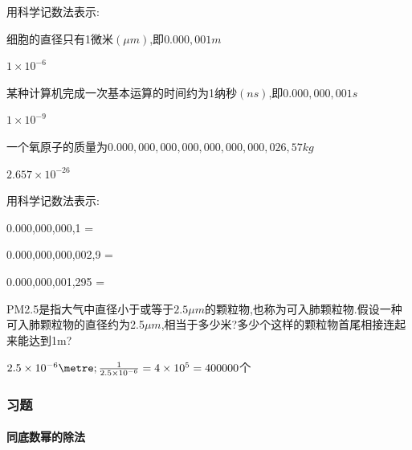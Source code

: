 \documentclass[cn,blue,12pt]{elegantbook}
\renewcommand \tkt[1]{{\CJKunderline[hidden=true, skip=true, thickness=1pt]{#1}}}
\begin{document}
\begin{liti}[resume]
\item 用科学记数法表示:
    \begin{liti}[resume]
    \item 细胞的直径只有1微米\((\mu m)\),即\(0.000,001m\)
\begin{solution}
            \(1\times 10^{-6}\)\metre \\
\end{solution}
    \item 某种计算机完成一次基本运算的时间约为1纳秒\((ns)\),即\(0.000,000,001s\)
\begin{solution}
            \(1\times 10^{-9}\)\second \\
\end{solution}
    \item 一个氧原子的质量为\(0.000,000,000,000,000,000,000,026,57kg\)
\begin{solution}
            \(2.657 \times 10^{-26}\) \kilogram \\
\end{solution}
    \end{liti}
\item 用科学记数法表示:
    \begin{liti}[resume]
    \item 0.000,000,000,1 = \tkt{\(1\times 10^{-10}\)}
    \item 0.000,000,000,002,9 = \tkt{\(2.9 \times 10^{-12}\)}
    \item 0.000,000,001,295 = \tkt{\(1.295 \times 10^{-9}\)}
    \end{liti}
\item PM2.5是指大气中直径小于或等于\(2.5 \mu m\)的颗粒物,也称为可入肺颗粒物.假设一种可入肺颗粒物的直径约为2.5\(\mu m\),相当于多少米?多少个这样的颗粒物首尾相接连起来能达到1m?
\begin{solution}
        \(2.5\times 10^{-6} \metre; \frac{1}{2.5\times 10^{-6}}= 4\times 10^5 = 400000 \)个\\
\end{solution}
\end{liti}

\subsubsection{习题}%
\label{ssub:习题}

\paragraph{同底数幂的除法}%
\label{par:同底数幂的除法}
\end{document}
